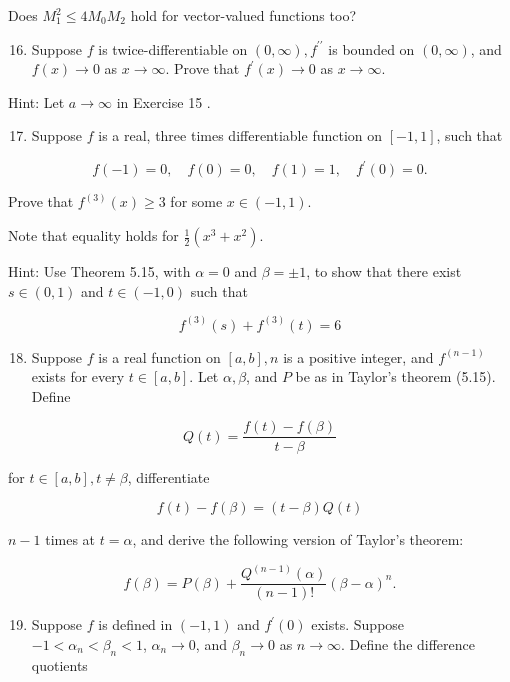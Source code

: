 \documentclass[10pt]{article}
\begin{document}
Does $M_{1}^{2} \leq 4 M_{0} M_{2}$ hold for vector-valued functions too?

\begin{enumerate}
  \setcounter{enumi}{15}
  \item Suppose $f$ is twice-differentiable on $(0, \infty), f^{\prime \prime}$ is bounded on $(0, \infty)$, and $f(x) \rightarrow 0$ as $x \rightarrow \infty$. Prove that $f^{\prime}(x) \rightarrow 0$ as $x \rightarrow \infty$.
\end{enumerate}

Hint: Let $a \rightarrow \infty$ in Exercise 15 .

\begin{enumerate}
  \setcounter{enumi}{16}
  \item Suppose $f$ is a real, three times differentiable function on $[-1,1]$, such that
\end{enumerate}

$$
f(-1)=0, \quad f(0)=0, \quad f(1)=1, \quad f^{\prime}(0)=0 .
$$

Prove that $f^{(3)}(x) \geq 3$ for some $x \in(-1,1)$.

Note that equality holds for $\frac{1}{2}\left(x^{3}+x^{2}\right)$.

Hint: Use Theorem 5.15, with $\alpha=0$ and $\beta= \pm 1$, to show that there exist $s \in(0,1)$ and $t \in(-1,0)$ such that

$$
f^{(3)}(s)+f^{(3)}(t)=6
$$

\begin{enumerate}
  \setcounter{enumi}{17}
  \item Suppose $f$ is a real function on $[a, b], n$ is a positive integer, and $f^{(n-1)}$ exists for every $t \in[a, b]$. Let $\alpha, \beta$, and $P$ be as in Taylor's theorem (5.15). Define
\end{enumerate}

$$
Q(t)=\frac{f(t)-f(\beta)}{t-\beta}
$$

for $t \in[a, b], t \neq \beta$, differentiate

$$
f(t)-f(\beta)=(t-\beta) Q(t)
$$

$n-1$ times at $t=\alpha$, and derive the following version of Taylor's theorem:

$$
f(\beta)=P(\beta)+\frac{Q^{(n-1)}(\alpha)}{(n-1) !}(\beta-\alpha)^{n} .
$$

\begin{enumerate}
  \setcounter{enumi}{18}
  \item Suppose $f$ is defined in $(-1,1)$ and $f^{\prime}(0)$ exists. Suppose $-1<\alpha_{n}<\beta_{n}<1$, $\alpha_{n} \rightarrow 0$, and $\beta_{n} \rightarrow 0$ as $n \rightarrow \infty$. Define the difference quotients
\end{enumerate}
\end{document}
